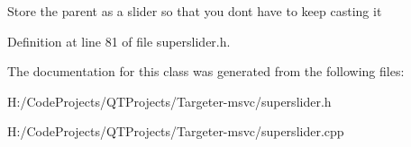 Store the parent as a slider so that you don\textquotesingle{}t have to keep casting it 

Definition at line 81 of file superslider.\+h.



The documentation for this class was generated from the following files\+:\begin{DoxyCompactItemize}
\item 
H\+:/\+Code\+Projects/\+Q\+T\+Projects/\+Targeter-\/msvc/superslider.\+h\item 
H\+:/\+Code\+Projects/\+Q\+T\+Projects/\+Targeter-\/msvc/superslider.\+cpp\end{DoxyCompactItemize}
